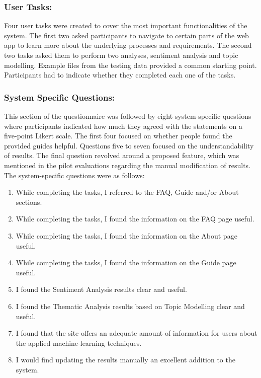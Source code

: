 \documentclass{l4proj}
\begin{document}
\subsubsection{User Tasks: } Four user tasks were created to cover the most important functionalities of the system. The first two asked participants to navigate to certain parts of the web app to learn more about the underlying processes and requirements. The second two tasks asked them to perform two analyses, sentiment analysis and topic modelling. Example files from the testing data provided a common starting point. Participants had to indicate whether they completed each one of the tasks.

\subsubsection{System Specific Questions: } This section of the questionnaire was followed by eight system-specific questions where participants indicated how much they agreed with the statements on a five-point Likert scale. The first four focused on whether people found the provided guides helpful. Questions five to seven focused on the understandability of results. The final question revolved around a proposed feature, which was mentioned in the pilot evaluations regarding the manual modification of results. The system-specific questions were as follows:
\begin{enumerate}
    \item While completing the tasks, I referred to the FAQ, Guide and/or About sections.
    \item While completing the tasks, I found the information on the FAQ page useful.
    \item While completing the tasks, I found the information on the About page useful.
    \item While completing the tasks, I found the information on the Guide page useful.
    \item I found the Sentiment Analysis results clear and useful.
    \item I found the Thematic Analysis results based on Topic Modelling clear and useful.
    \item I found that the site offers an adequate amount of information for users about the applied machine-learning techniques.
    \item I would find updating the results manually an excellent addition to the system.
\end{enumerate}
\end{document}
